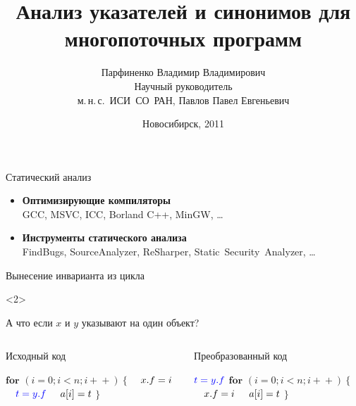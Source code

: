 \documentclass[usenames,dvipsnames,pdftex,unicode]{beamer}
\title[Анализ указателей и синонимов]{
  Анализ указателей и синонимов для многопоточных программ
}
\author[Владимир Парфиненко]{
  Парфиненко Владимир Владимирович
  \texorpdfstring{%
    \\ \vspace{5mm} \small Научный руководитель\\ м.\,н.\,с.~ИСИ~СО~РАН, Павлов Павел
    Евгеньевич
  }{}%
}
\institute{
  Новосибирский Государственный Университет
}
\date{
  Новосибирск, 2011
}
\begin{document}
\begin{frame}
  \titlepage
\end{frame}

\begin{frame}{Статический анализ}

  \begin{itemize}
    \item \textbf{Оптимизирующие компиляторы}\\
        GCC, MSVC, ICC, Borland C++, MinGW, \ldots
    \item \textbf{Инструменты статического анализа}\\
        FindBugs, SourceAnalyzer, ReSharper, Static~Security~Analyzer, \ldots
  \end{itemize}

\end{frame}

\begin{frame}{Вынесение инварианта из цикла}

  \begin{visibleenv}<2>
    \begin{center}
      \large А что если $x$ и $y$ указывают на один объект?
    \end{center}
  \end{visibleenv}

  \begin{columns}[t]
    \begin{column}{5cm}
      \begin{block}{Исходный код}
        \begin{algorithmic}
          \STATE $\textbf{for }(i = 0; i < n; i\!+\!+)\ \{$
          \STATE $\text{\quad}x.f = i$
          \STATE $\text{\quad}\textcolor{blue}{t = y.f}$
          \STATE $\text{\quad}a[i] = t$
          \STATE $\}$
        \end{algorithmic}
      \end{block}
    \end{column}
    \begin{column}{5cm}
      \begin{block}{Преобразованный код}
        \begin{algorithmic}
          \STATE $\textcolor{blue}{t = y.f}$
          \STATE $\textbf{for }(i = 0; i < n; i\!+\!+)\ \{$
          \STATE $\text{\quad}x.f = i$
          \STATE $\text{\quad}a[i] = t$
          \STATE $\}$
        \end{algorithmic}
      \end{block}
    \end{column}
  \end{columns}

\end{frame}
\end{document}
